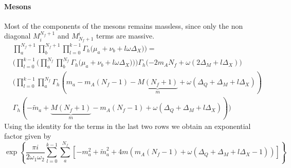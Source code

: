 \paragraph{Mesons}
Most of the components of the mesons remains massless, since only the non diagonal $M_{i}^{N_f+1}$ and $M_{N_f+1}^{i}$ terms are massive.
\begin{equation}
\begin{aligned}
& \prod_a^{N_f+1} \prod_b^{N_f+1}  \prod_{l=0}^{k-1}   \Gamma_h \big( \mu_a+  \nu_b + l \omega \Delta_X) \big)  = \\
& \bigg(  \prod_{l=0}^{k-1}  \bigg ( \prod_a^{N_f} \prod_b^{N_f} \Gamma_h \big( \mu_a + \nu_b + l \omega \Delta_X) \big)  \bigg)\Gamma_h( - 2 m_A N_f + \omega ( 2 \Delta_M +  l \Delta_X) \bigg)  \\
 &  \bigg(  \prod_{l=0}^{k-1} \prod_a^{N_f} \Gamma_h (m_a - m_A (N_f-1) - \underbrace{M(N_f+1)}_m  + \omega ( \Delta_Q + \Delta_M + l \Delta_X))\\
 & \Gamma_h(  - \tilde{m}_a + \underbrace{M (N_f +1)}_m - m_A ( N_f-1) + \omega ( \Delta_Q + \Delta_M + l \Delta_X) ) \bigg)
\end{aligned}
\end{equation}
Using the identity for the terms in the last two rows we obtain an exponential factor given by
\begin{equation}
\exp
\left\{ \frac{\pi i }{2 \omega_1 \omega_2}
\sum_{l=0}^{k-1} \sum_a^{N_f}
\left[ - m_a^2 + \tilde{m}_a^2 + 4  m \left( m_A (N_f - 1)  + \omega \left( \Delta_Q +  \Delta_M + l\Delta_X  -1\right)  \right)
\right]
\right\}
\label{eqn:contributo_mesoni}
\end{equation}

